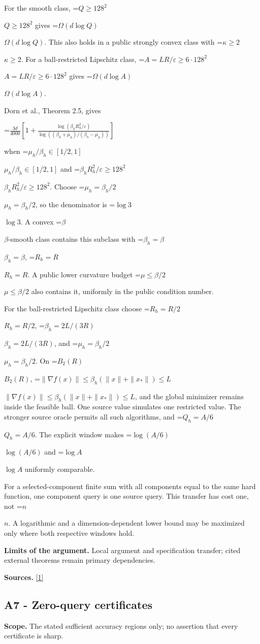 \documentclass[10pt,a4paper]{article}
\newcommand{\AtlasMath}[1]{\par\begingroup\centering\setbox0=\hbox{$\displaystyle #1$}\ifdim\wd0>1.4\linewidth\typeout{ATLAS WIDE FORMULA: \the\wd0}\fi\ifdim\wd0>\linewidth\resizebox{\linewidth}{!}{\box0}\else\box0\fi\par\endgroup}
\newcommand{\AtlasInlineMath}[1]{\begingroup\setbox0=\hbox{$#1$}\ifdim\wd0>.4\linewidth\endgroup\AtlasMath{#1}\else\endgroup$#1$\fi}
\begin{document}
For the smooth class, \AtlasInlineMath{Q\ge128^2} gives \AtlasInlineMath{\Omega(d\log Q)}. This also holds in a public strongly convex class with \AtlasInlineMath{\kappa\ge2}. For a ball-restricted Lipschitz class, \AtlasInlineMath{A=LR/\varepsilon\ge6\cdot128^2} gives \AtlasInlineMath{\Omega(d\log A)}.

Dorn et al., Theorem 2.5, gives

\AtlasMath{\frac{3d}{4000}\left[1+\frac{\log(\beta_hR_h^2/\varepsilon)}{\log((\beta_h+\mu_h)/(\beta_h-\mu_h))}\right]}

when \AtlasInlineMath{\mu_h/\beta_h\in[1/2,1]} and \AtlasInlineMath{\beta_hR_h^2/\varepsilon\ge128^2}. Choose \AtlasInlineMath{\mu_h=\beta_h/2}, so the denominator is \AtlasInlineMath{\log3}. A convex \AtlasInlineMath{\beta}-smooth class contains this subclass with \AtlasInlineMath{\beta_h=\beta}, \AtlasInlineMath{R_h=R}. A public lower curvature budget \AtlasInlineMath{\mu\le\beta/2} also contains it, uniformly in the public condition number.

For the ball-restricted Lipschitz class choose \AtlasInlineMath{R_h=R/2}, \AtlasInlineMath{\beta_h=2L/(3R)}, and \AtlasInlineMath{\mu_h=\beta_h/2}. On \AtlasInlineMath{B_2(R)}, \AtlasInlineMath{\|\nabla f(x)\|\le\beta_h(\|x\|+\|x_*\|)\le L}, and the global minimizer remains inside the feasible ball. One source value simulates one restricted value. The stronger source oracle permits all such algorithms, and \AtlasInlineMath{Q_h=A/6}. The explicit window makes \AtlasInlineMath{\log(A/6)} and \AtlasInlineMath{\log A} uniformly comparable.

For a selected-component finite sum with all components equal to the same hard function, one component query is one source query. This transfer has cost one, not \AtlasInlineMath{n}. A logarithmic and a dimension-dependent lower bound may be maximized only where both respective windows hold.

\textbf{Limits of the argument.} Local argument and specification transfer; cited external theorems remain primary dependencies.

\textbf{Sources.} \href{https://arxiv.org/html/2610.00345v1}{[1]}

\subsection{A7 - Zero-query certificates}
\textbf{Scope.} The stated sufficient accuracy regions only; no assertion that every certificate is sharp.
\end{document}
